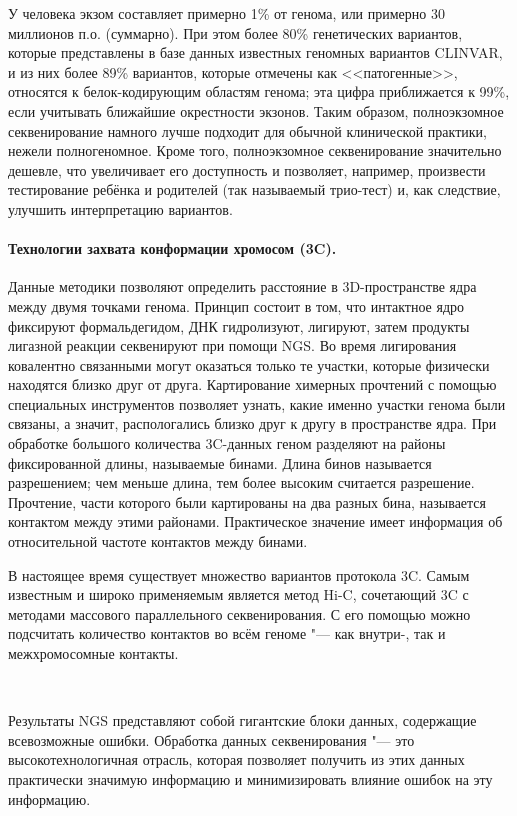\documentclass[a4paper,12pt]{article}
\begin{document}
У человека экзом составляет примерно 1\% от генома, или примерно 30 миллионов п.о. (суммарно).
При этом более 80\% генетических вариантов, которые представлены в базе данных известных геномных вариантов CLINVAR\cite{Landrum_2017}, и из них более 89\% вариантов, которые отмечены как <<патогенные>>, относятся к белок-кодирующим областям генома;
эта цифра приближается к 99\%, если учитывать ближайшие окрестности экзонов\cite{Barbitoff_2020}.
Таким образом, полноэкзомное секвенирование намного лучше подходит для обычной клинической практики, нежели полногеномное.
Кроме того, полноэкзомное секвенирование значительно дешевле, что увеличивает его доступность и позволяет, например, произвести тестирование ребёнка и родителей (так называемый трио-тест) и, как следствие, улучшить интерпретацию вариантов\cite{Yohe_2017}.

\paragraph{Технологии захвата конформации хромосом (3C).}
Данные методики позволяют определить расстояние в 3D-пространстве ядра между двумя точками генома.
Принцип состоит в том, что интактное ядро фиксируют формальдегидом, ДНК гидролизуют, лигируют, затем продукты лигазной реакции секвенируют при помощи NGS.
Во время лигирования ковалентно связанными могут оказаться только те участки, которые физически находятся близко друг от друга.
Картирование химерных прочтений с помощью специальных инструментов позволяет узнать, какие именно участки генома были связаны, а значит, распологались близко друг к другу в пространстве ядра\cite{Lieberman_Aiden_2009}.
При обработке большого количества 3C-данных геном разделяют на районы фиксированной длины, называемые бинами.
Длина бинов называется разрешением; чем меньше длина, тем более высоким считается разрешение.
Прочтение, части которого были картированы на два разных бина, называется контактом между этими районами.
Практическое значение имеет информация об относительной частоте контактов между бинами.

В настоящее время существует множество вариантов протокола 3C.
Самым известным и широко применяемым является метод Hi-C, сочетающий 3C с методами массового параллельного секвенирования.
С его помощью можно подсчитать количество контактов во всём геноме "--- как внутри-, так и межхромосомные контакты\cite{Oluwadare_2019}.

~

Результаты NGS представляют собой гигантские блоки данных, содержащие всевозможные ошибки.
Обработка данных секвенирования "--- это высокотехнологичная отрасль, которая позволяет получить из этих данных практически значимую информацию и минимизировать влияние ошибок на эту информацию.
\end{document}
